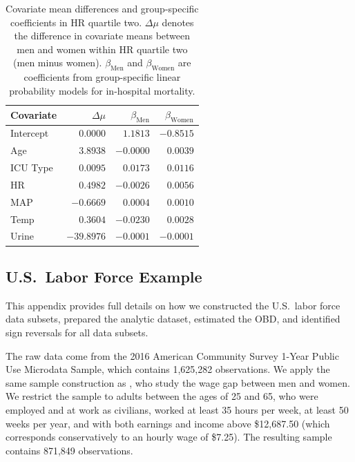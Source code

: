 \begin{table}[!ht]
    \caption{Covariate mean differences and group-specific coefficients in HR quartile two. $\Delta\mu$ denotes the difference in covariate means between men and women within HR quartile two (men minus women). $\beta_{\text{Men}}$ and $\beta_{\text{Women}}$ are coefficients from group-specific linear probability models for in-hospital mortality.}
    \label{tab:delta_mu_betas}
    \centering
    \small
    \begin{tabular}{lrrr}
    \toprule
    Covariate 
    & $\Delta\mu$ 
    & $\beta_{\text{Men}}$ 
    & $\beta_{\text{Women}}$ \\
    \midrule
    Intercept & $0.0000$   & $1.1813$  & $-0.8515$ \\
    Age       & $3.8938$   & $-0.0000$ & $0.0039$ \\
    ICU Type  & $0.0095$   & $0.0173$  & $0.0116$ \\
    HR        & $0.4982$   & $-0.0026$ & $0.0056$ \\
    MAP       & $-0.6669$  & $0.0004$  & $0.0010$ \\
    Temp      & $0.3604$   & $-0.0230$ & $0.0028$ \\
    Urine     & $-39.8976$ & $-0.0001$ & $-0.0001$ \\
    \bottomrule
    \end{tabular}
\end{table}
    
\subsection{U.S.\ Labor Force Example}
\label{appendix:us_labor_force}
This appendix provides full details on how we constructed the U.S.\ labor force data subsets, prepared the analytic dataset, estimated the OBD, and identified sign reversals for all data subsets. %
 
The raw data come from the 2016 American Community Survey 1-Year Public Use Microdata Sample, which contains 1,625,282 observations.
We apply the same sample construction as \citet{bach2024heterogeneity}, who study the wage gap between men and women.
We restrict the sample to adults between the ages of 25 and 65, who were employed and at work as civilians, worked at least 35 hours per week, at least 50 weeks per year, and with both earnings and income above \$12,687.50 (which corresponds conservatively to an hourly wage of \$7.25).
The resulting sample contains 871,849 observations.

